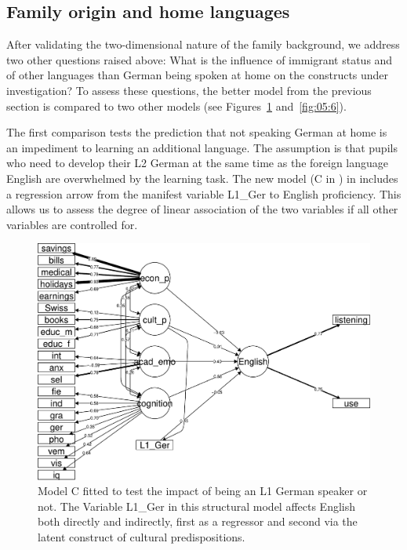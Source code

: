 \documentclass[output=paper]{langsci/langscibook}
\begin{document}
\subsection{Family origin and home languages}

After validating the two-dimensional nature of the family background, we address two other questions raised above: What is the influence of immigrant status and of other languages than German being spoken at home on the constructs under investigation? To assess these questions, the better model from the previous section is compared to two other models (see Figures~\ref{fig:05:5} and~\ref{fig:05:6}).

The first comparison tests the prediction that not speaking German at home is an impediment to learning an additional language.  The assumption is that pupils who need to develop their L2 German at the same time as the foreign language English are overwhelmed by the learning task. The new model (C in ) in  includes a regression arrow from the manifest variable L1\_Ger to English proficiency. This allows us to assess the degree of linear association of the two variables if all other variables are controlled for.\largerpage[-2]

\begin{figure}
\includegraphics[width=\textwidth]{figures/Figure5.5.pdf}
\caption{Model C fitted to test the impact of being an L1 German speaker or not. The Variable L1\_Ger in this structural model affects English both directly and indirectly, first as a regressor and second via the latent construct of cultural predispositions.\label{fig:05:5}}
\end{figure}
\end{document}
